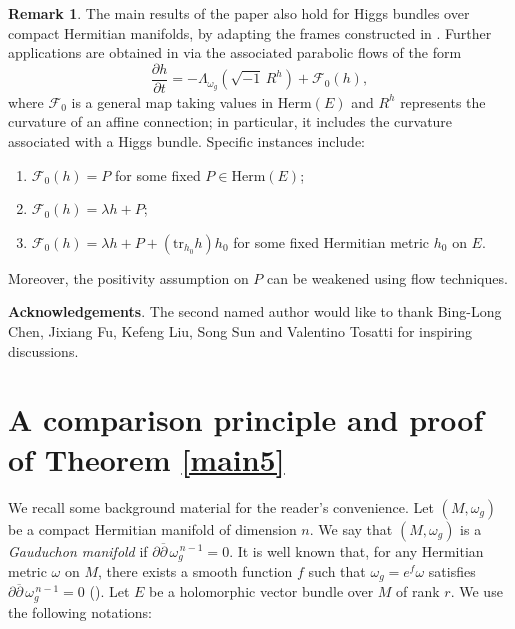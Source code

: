 \documentclass[12pt, reqno]{amsart}
\theoremstyle{plain}
\theoremstyle{definition}
\newtheorem{remark}[thm]{Remark}
\newcommand{\bremark}{\begin{remark}}
\newcommand{\eremark}{\end{remark}}
\renewcommand{\bar}{\overline}
\renewcommand{\>}{\rightarrow}
\renewcommand{\>}{\rightarrow}
\renewcommand{\bar}{\overline}
\numberwithin{equation}{section} %
\begin{document}
\bremark The main results of the paper  also hold for Higgs bundles over compact Hermitian manifolds,
by adapting the frames constructed in \cite{FWYY26+}.
Further applications are obtained in \cite{XYY26+} via the associated parabolic flows of the form
\begin{equation}
\label{GHYMF}
\frac{\partial h}{\partial t} = -\Lambda_{\omega_g}\left(\sqrt{-1}\, R^h\right) + \mathcal{F}_0(h),
\end{equation}
where $\mathcal{F}_0$ is a general map taking values in $\mathrm{Herm}(E)$ and $R^{h}$ represents the curvature of an affine connection; in particular, it includes the curvature associated with a Higgs bundle. Specific instances include:
\begin{enumerate}[label=(\roman*)]
	\item $\mathcal{F}_0(h) = P$ for some fixed $P \in \mathrm{Herm}(E)$;
	\item $\mathcal{F}_0(h) = \lambda h+P$;
	\item $\mathcal{F}_0(h) = \lambda h + P + (\mathrm{tr}_{h_0} h) h_0$ for some fixed Hermitian metric $h_0$ on $E$.
\end{enumerate}
Moreover, the positivity assumption on $P$ can be weakened using flow techniques.
\eremark


\noindent\textbf{Acknowledgements}. The second named author would like to thank Bing-Long Chen, Jixiang Fu, Kefeng Liu, Song Sun and Valentino Tosatti for inspiring  discussions.


\baselineskip

\section{A comparison principle and proof of Theorem \ref{main5}}


We recall some background material  for the reader's convenience.
Let $(M,\omega_g)$ be a compact Hermitian manifold of dimension $n$.
We say that $(M,\omega_g)$ is a \emph{Gauduchon manifold} if
$
\partial\bar{\partial}\,\omega_g^{\,n-1}=0.
$
It is well known that, for any Hermitian metric $\omega$ on $M$,
there exists a smooth function $f$ such that
$
\omega_g = e^{f}\omega
$
satisfies $\partial\bar{\partial}\,\omega_g^{\,n-1}=0$ (\cite{Gau84}). Let $E$ be a holomorphic vector bundle over $M$ of rank $r$. We use the following notations:
\end{document}
